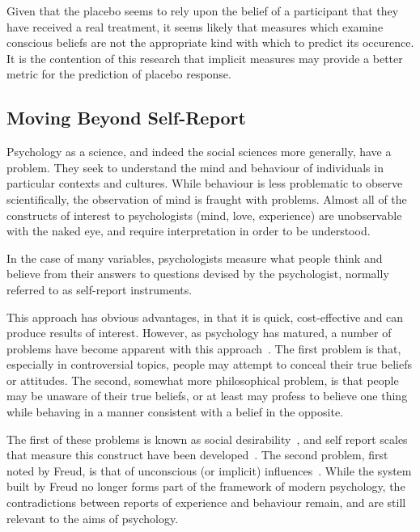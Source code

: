 Given that the placebo seems to rely upon the belief of a participant that they have received a real treatment, it seems likely that measures which examine conscious beliefs are not the appropriate kind with which to predict its occurence. It is the contention of this research that implicit measures may provide a better metric for the prediction of placebo response. 

\subsection{Moving Beyond Self-Report}
\label{sec:implicit-measures}

Psychology as a science, and indeed the social sciences more generally, have a problem. They seek to understand the mind and behaviour of individuals in particular contexts and cultures. While behaviour is less problematic to observe scientifically, the observation of mind is fraught with problems. Almost all of the constructs of interest to psychologists (mind, love, experience) are unobservable with the naked eye, and require interpretation in order to be understood. 

In the case of many variables, psychologists measure what people think and believe from their answers to questions devised by the psychologist, normally referred to as self-report instruments. 

This approach has obvious advantages, in that it is quick, cost-effective and can produce results of interest. However, as psychology has matured, a number of problems have become apparent with this approach~\cite{Nisbett1977}.  The first problem is that, especially in controversial topics, people may attempt to conceal their true beliefs or attitudes. The second, somewhat more philosophical problem, is that people may be unaware of their true beliefs, or at least may profess to believe one thing while behaving in a manner consistent with a belief in the opposite. 

The first of these problems is known as social desirability~\cite{Egloff2003}, and  self report scales that measure this construct have been developed~\cite{Giebel2008}. The second problem, first noted by Freud, is that of unconscious (or implicit) influences~\cite{Hofmann2008}. While the system built by Freud no longer forms part of the framework of modern psychology, the contradictions between reports of experience and behaviour remain, and are still relevant to the aims of psychology. %



